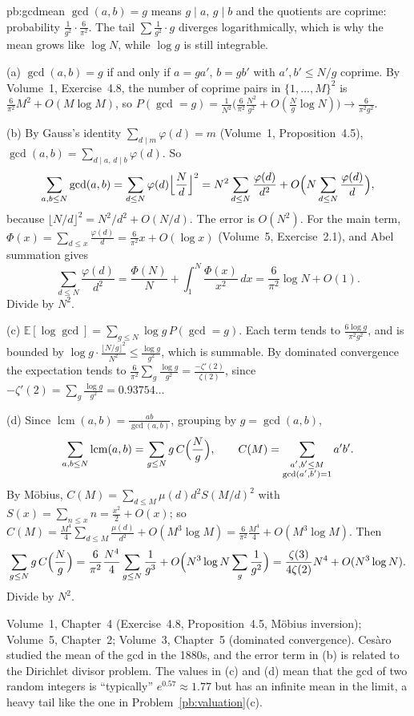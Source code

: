 \begin{solution}{pb:gcdmean}
\idea $\gcd(a,b)=g$ means $g\mid a$, $g\mid b$ and the quotients are coprime: probability $\frac1{g^2}\cdot\frac6{\pi^2}$. The tail
$\sum\frac1{g^2}\cdot g$ diverges logarithmically, which is why the mean grows like $\log N$, while $\log g$ is still integrable.

\writeup (a) $\gcd(a,b)=g$ if and only if $a=ga'$, $b=gb'$ with $a',b'\le N/g$ coprime. By Volume~1, Exercise~4.8, the number of coprime
pairs in $\{1,\dots,M\}^2$ is $\frac6{\pi^2}M^2+O(M\log M)$, so $P(\gcd=g)=\frac1{N^2}\bigl(\frac6{\pi^2}\frac{N^2}{g^2}+O(\frac Ng\log N)\bigr)\to\frac6{\pi^2g^2}$.

(b) By Gauss's identity $\sum_{d\mid m}\varphi(d)=m$ (Volume~1, Proposition~4.5), $\gcd(a,b)=\sum_{d\mid a,\,d\mid b}\varphi(d)$. So
\[
\sum_{a,b\le N}\gcd(a,b)=\sum_{d\le N}\varphi(d)\Bigl\lfloor\frac Nd\Bigr\rfloor^2=N^2\sum_{d\le N}\frac{\varphi(d)}{d^2}+O\Bigl(N\sum_{d\le N}\frac{\varphi(d)}d\Bigr),
\]
because $\lfloor N/d\rfloor^2=N^2/d^2+O(N/d)$. The error is $O(N^2)$. For the main term, $\Phi(x)=\sum_{d\le x}\frac{\varphi(d)}d=\frac6{\pi^2}x+O(\log x)$
(Volume~5, Exercise~2.1), and Abel summation gives
\[
\sum_{d\le N}\frac{\varphi(d)}{d^2}=\frac{\Phi(N)}N+\int_1^N\frac{\Phi(x)}{x^2}\,dx=\frac6{\pi^2}\log N+O(1).
\]
Divide by $N^2$.

(c) $\mathbb E[\log\gcd]=\sum_{g\le N}\log g\,P(\gcd=g)$. Each term tends to $\frac{6\log g}{\pi^2g^2}$, and is bounded by
$\log g\cdot\frac{\lfloor N/g\rfloor^2}{N^2}\le\frac{\log g}{g^2}$, which is summable. By dominated convergence the expectation tends
to $\frac6{\pi^2}\sum_g\frac{\log g}{g^2}=\frac{-\zeta'(2)}{\zeta(2)}$, since $-\zeta'(2)=\sum_g\frac{\log g}{g^2}=0.93754\ldots$

(d) Since $\operatorname{lcm}(a,b)=\frac{ab}{\gcd(a,b)}$, grouping by $g=\gcd(a,b)$,
\[
\sum_{a,b\le N}\operatorname{lcm}(a,b)=\sum_{g\le N}g\,C\Bigl(\frac Ng\Bigr),\qquad C(M)=\sum_{\substack{a',b'\le M\\\gcd(a',b')=1}}a'b'.
\]
By Möbius, $C(M)=\sum_{d\le M}\mu(d)d^2S(M/d)^2$ with $S(x)=\sum_{n\le x}n=\frac{x^2}2+O(x)$; so
$C(M)=\frac{M^4}4\sum_{d\le M}\frac{\mu(d)}{d^2}+O(M^3\log M)=\frac{6}{\pi^2}\frac{M^4}4+O(M^3\log M)$. Then
\[
\sum_{g\le N}g\,C\Bigl(\frac Ng\Bigr)=\frac6{\pi^2}\frac{N^4}4\sum_{g\le N}\frac1{g^3}+O\Bigl(N^3\log N\sum_g\frac1{g^2}\Bigr)=\frac{\zeta(3)}{4\zeta(2)}N^4+O(N^3\log N).
\]
Divide by $N^2$.

\tools Volume~1, Chapter~4 (Exercise~4.8, Proposition~4.5, Möbius inversion); Volume~5, Chapter~2; Volume~3, Chapter~5 (dominated
convergence).
\leads Cesàro studied the mean of the gcd in the 1880s, and the error term in (b) is related to the Dirichlet divisor problem.
The values in (c) and (d) mean that the gcd of two random integers is ``typically'' $e^{0.57}\approx1.77$ but has an infinite
mean in the limit, a heavy tail like the one in Problem~\ref{pb:valuation}(c).
\end{solution}

